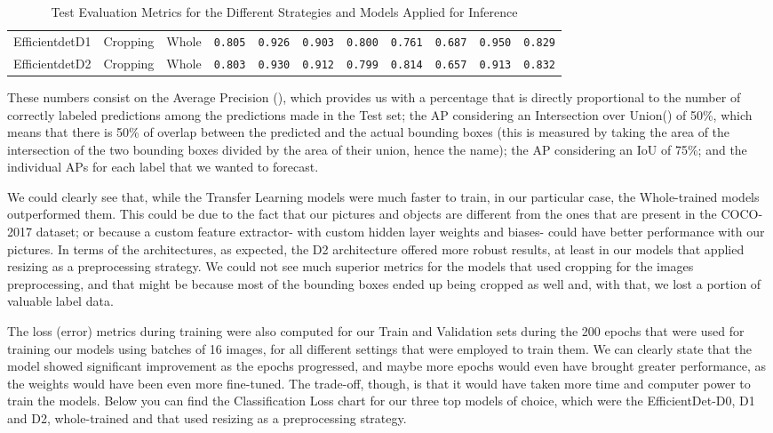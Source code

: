 \documentclass[openright]{normas-utf-tex} %
\begin{document}
\begin{table}[H]
\begin{adjustbox}{width=1\textwidth}
\begin{tabular}{c|c|c|c|c|c|c|c|c|c|c}
		Efficientdet\-D1 & Cropping & Whole & \texttt{0.805} & \texttt{0.926} & \texttt{0.903} & \texttt{0.800} & \texttt{0.761} & \texttt{0.687} & \texttt{0.950} & \texttt{0.829} \\
		Efficientdet\-D2 & Cropping & Whole & \texttt{0.803} & \texttt{0.930} & \texttt{0.912} & \texttt{0.799} & \texttt{0.814} & \texttt{0.657} & \texttt{0.913} & \texttt{0.832} \\
		\hline 
	\end{tabular}
	\end{adjustbox}
	\caption[Test Evaluation Metrics for the Different Strategies and Models Applied for Inference]{Test Evaluation Metrics for the Different Strategies and Models Applied for Inference}
\end{table}

These numbers consist on the Average Precision (), which provides us with 
a percentage that is directly proportional to the number of correctly labeled predictions
among the predictions made in the Test set; the AP considering an 
Intersection over Union() of 50\%, which means that there is 
50\% of overlap between the predicted and the actual bounding boxes (this is measured by 
taking the area of the intersection of the two bounding boxes divided by the area of their union, 
hence the name); the AP considering an IoU of 75\%; and the individual APs for each label that 
we wanted to forecast. 

We could clearly see that, while the Transfer Learning models were much faster to train,
in our particular case, the Whole-trained models outperformed them. This could be 
due to the fact that our pictures and objects are different from the
ones that are present in the COCO-2017 dataset; or because a custom feature extractor- 
with custom hidden layer weights and biases- could have better performance with our pictures. 
In terms of the architectures, as expected, the D2 architecture offered more robust results, at least in
our models that applied resizing as a preprocessing strategy. We could not see much superior metrics for
the models that used cropping for the images preprocessing, and that might be because most of the 
bounding boxes ended up being cropped as well and, with that, we lost a portion of valuable label data. 

The loss (error) metrics during training were also computed for our Train and Validation sets during the 
200 epochs that were used for training our models using batches of 16 images, for all different 
settings that were employed to train them. We can clearly state that the model showed significant
improvement as the epochs progressed, and maybe more epochs would even have brought greater performance,
as the weights would have been even more fine-tuned. The trade-off, though, is that it would have 
taken more time and computer power to train the models.
Below you can find the Classification Loss chart for our three top models of choice, which were
the EfficientDet-D0, D1 and D2, whole-trained and that used resizing as a preprocessing strategy.
\end{document}

